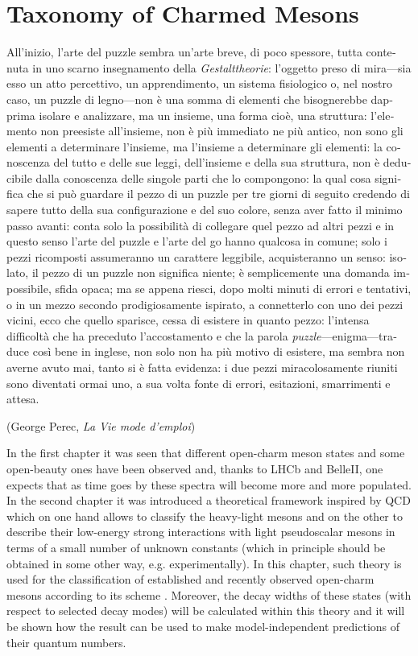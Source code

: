 \chapter{Taxonomy of Charmed Mesons}

\epigraph{\textitalian{All'inizio, l'arte del puzzle sembra un'arte breve, di poco spessore, tutta contenuta in uno scarno insegnamento della \emph{Gestalttheorie}: l'oggetto preso di mira---sia esso un atto percettivo, un apprendimento, un sistema fisiologico o, nel nostro caso, un puzzle di legno---non è una somma di elementi che bisognerebbe dapprima isolare e analizzare, ma un insieme, una forma cioè, una struttura: l'elemento non preesiste all'insieme, non è più immediato ne più antico, non sono gli elementi a determinare l'insieme, ma l'insieme a determinare gli elementi: la conoscenza del tutto e delle sue leggi, dell'insieme e della sua struttura, non è deducibile dalla conoscenza delle singole parti che lo compongono: la qual cosa significa che si può guardare il pezzo di un puzzle per tre giorni di seguito credendo di sapere tutto della sua configurazione e del suo colore, senza aver fatto il minimo passo avanti: conta solo la possibilità di collegare quel pezzo ad altri pezzi e in questo senso l'arte del puzzle e l'arte del go hanno qualcosa in comune; solo i pezzi ricomposti assumeranno un carattere leggibile, acquisteranno un senso: isolato, il pezzo di un puzzle non significa niente; è semplicemente una domanda impossibile, sfida opaca; ma se appena riesci, dopo molti minuti di errori e tentativi, o in un mezzo secondo prodigiosamente ispirato, a connetterlo con uno dei pezzi vicini, ecco che quello sparisce, cessa di esistere in quanto pezzo: l'intensa difficoltà che ha preceduto l'accostamento e che la parola \emph{puzzle}---enigma---traduce così bene in inglese, non solo non ha più motivo di esistere, ma sembra non averne avuto mai, tanto si è fatta evidenza: i due pezzi miracolosamente riuniti sono diventati ormai uno, a sua volta fonte di errori, esitazioni, smarrimenti e attesa.}}{(George Perec, \emph{La Vie mode d'emploi})}

In the first chapter it was seen that different open-charm meson states and some open-beauty ones have been observed and, thanks to LHCb and BelleII, one expects that as time goes by these spectra will become more and more populated. In the second chapter it was introduced a theoretical framework inspired by QCD which on one hand allows to classify the heavy-light mesons and on the other to describe their low-energy strong interactions with light pseudoscalar mesons in terms of a small number of unknown constants (which in principle should be obtained in some other way, e.g. experimentally). In this chapter, such theory is used for the classification of established and recently observed open-charm mesons according to its scheme \cite{Colangelo:2012xi}. Moreover, the decay widths of these states (with respect to selected decay modes) will be calculated within this theory and it will be shown how the result can be used to make model-independent predictions of their quantum numbers.

